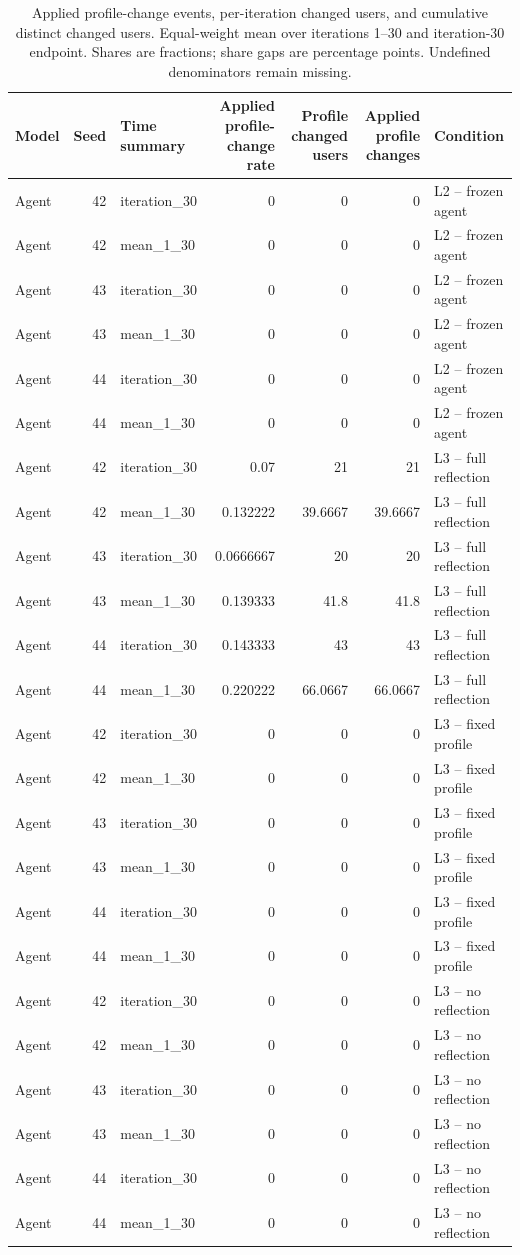 \begin{table}[htbp!]
\centering
\small
\setlength{\tabcolsep}{3pt}
\renewcommand{\arraystretch}{1.1}
\begin{tabular}{lrlrrrl}
\hline
Model & Seed & Time summary & Applied profile-change rate & Profile changed users & Applied profile changes & Condition \\
\hline
Agent & 42 & iteration\_30 & 0 & 0 & 0 & L2 -- frozen agent \\
Agent & 42 & mean\_1\_30 & 0 & 0 & 0 & L2 -- frozen agent \\
Agent & 43 & iteration\_30 & 0 & 0 & 0 & L2 -- frozen agent \\
Agent & 43 & mean\_1\_30 & 0 & 0 & 0 & L2 -- frozen agent \\
Agent & 44 & iteration\_30 & 0 & 0 & 0 & L2 -- frozen agent \\
Agent & 44 & mean\_1\_30 & 0 & 0 & 0 & L2 -- frozen agent \\
Agent & 42 & iteration\_30 & 0.07 & 21 & 21 & L3 -- full reflection \\
Agent & 42 & mean\_1\_30 & 0.132222 & 39.6667 & 39.6667 & L3 -- full reflection \\
Agent & 43 & iteration\_30 & 0.0666667 & 20 & 20 & L3 -- full reflection \\
Agent & 43 & mean\_1\_30 & 0.139333 & 41.8 & 41.8 & L3 -- full reflection \\
Agent & 44 & iteration\_30 & 0.143333 & 43 & 43 & L3 -- full reflection \\
Agent & 44 & mean\_1\_30 & 0.220222 & 66.0667 & 66.0667 & L3 -- full reflection \\
Agent & 42 & iteration\_30 & 0 & 0 & 0 & L3 -- fixed profile \\
Agent & 42 & mean\_1\_30 & 0 & 0 & 0 & L3 -- fixed profile \\
Agent & 43 & iteration\_30 & 0 & 0 & 0 & L3 -- fixed profile \\
Agent & 43 & mean\_1\_30 & 0 & 0 & 0 & L3 -- fixed profile \\
Agent & 44 & iteration\_30 & 0 & 0 & 0 & L3 -- fixed profile \\
Agent & 44 & mean\_1\_30 & 0 & 0 & 0 & L3 -- fixed profile \\
Agent & 42 & iteration\_30 & 0 & 0 & 0 & L3 -- no reflection \\
Agent & 42 & mean\_1\_30 & 0 & 0 & 0 & L3 -- no reflection \\
Agent & 43 & iteration\_30 & 0 & 0 & 0 & L3 -- no reflection \\
Agent & 43 & mean\_1\_30 & 0 & 0 & 0 & L3 -- no reflection \\
Agent & 44 & iteration\_30 & 0 & 0 & 0 & L3 -- no reflection \\
Agent & 44 & mean\_1\_30 & 0 & 0 & 0 & L3 -- no reflection \\
\hline
\end{tabular}
\caption{Applied profile-change events, per-iteration changed users, and cumulative distinct changed users. Equal-weight mean over iterations 1--30 and iteration-30 endpoint. Shares are fractions; share gaps are percentage points. Undefined denominators remain missing.}
\label{chap:results:tab:rq3_agents_profile_changes}
\end{table}
